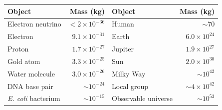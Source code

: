 \newpage

\begin{tcolorbox}[
    enhanced,
    colframe=technicalcolor,
    colback=gray!5,
    boxrule=0.8pt,
    arc=0mm,
    left=8pt,
    right=8pt,
    top=8pt,
    bottom=8pt,
    title={\textbf{Mass Scales in the universe}},
    fonttitle=\bfseries,
    coltitle=white,
    colbacktitle=technicalcolor
]
\small
\renewcommand{\arraystretch}{1.3}
\begin{center}
\begin{tabular}{l r l r}
\toprule
\textbf{Object} & \textbf{Mass (kg)} & \textbf{Object} & \textbf{Mass (kg)} \\
\midrule
Electron neutrino & $< 2 \times 10^{-36}$ & Human & $\sim 70$ \\[4pt]
Electron & $9.1 \times 10^{-31}$ & Earth & $6.0 \times 10^{24}$ \\[4pt]
Proton & $1.7 \times 10^{-27}$ & Jupiter & $1.9 \times 10^{27}$ \\[4pt]
Gold atom & $3.3 \times 10^{-25}$ & Sun & $2.0 \times 10^{30}$ \\[4pt]
Water molecule & $3.0 \times 10^{-26}$ & Milky Way & $\sim 10^{42}$ \\[4pt]
DNA base pair & $\sim 10^{-24}$ & Local group & $\sim 4 \times 10^{42}$ \\[4pt]
\textit{E. coli} bacterium & $\sim 10^{-15}$ & Observable universe & $\sim 10^{53}$ \\[4pt]
\bottomrule
\end{tabular}
\end{center}
\end{tcolorbox}

\vspace{1em}


